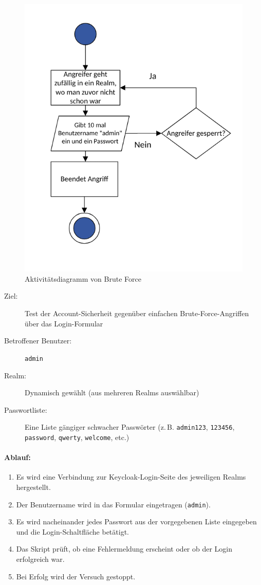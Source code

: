 \documentclass[a4paper,12pt]{article}
\begin{document}
	\begin{figure}
		\centering
		\includegraphics[width=0.5\linewidth]{Bilder/bf_ad}
		\caption{Aktivitätsdiagramm von Brute Force}
		\label{fig:bfad}
	\end{figure}
	
	\begin{description}
		\item[Ziel:] Test der Account-Sicherheit gegenüber einfachen Brute-Force-Angriffen über das Login-Formular
		\item[Betroffener Benutzer:] \texttt{admin}
		\item[Realm:] Dynamisch gewählt (aus mehreren Realms auswählbar)
		\item[Passwortliste:] Eine Liste gängiger schwacher Passwörter (z.\,B. \texttt{admin123}, \texttt{123456}, \texttt{password}, \texttt{qwerty}, \texttt{welcome}, etc.)
	\end{description}
	
	\paragraph{Ablauf:}
	\begin{enumerate}
		\item Es wird eine Verbindung zur Keycloak-Login-Seite des jeweiligen Realms hergestellt.
		\item Der Benutzername wird in das Formular eingetragen (\texttt{admin}).
		\item Es wird nacheinander jedes Passwort aus der vorgegebenen Liste eingegeben und die Login-Schaltfläche betätigt.
		\item Das Skript prüft, ob eine Fehlermeldung erscheint oder ob der Login erfolgreich war.
		\item Bei Erfolg wird der Versuch gestoppt.
	\end{enumerate}
	
\end{document}

